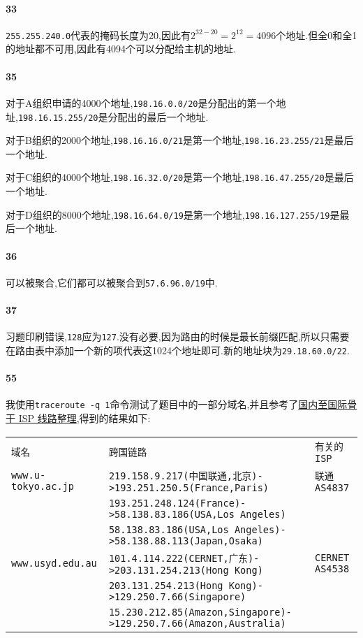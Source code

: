 \documentclass[a4paper]{article}
\begin{document}
\paragraph{33}
\verb|255.255.240.0|代表的掩码长度为20,因此有$2^{32-20}=2^{12}=4096$个地址.但全0和全1的地址都不可用,因此有4094个可以分配给主机的地址.
\paragraph{35}
对于A组织申请的4000个地址,\verb|198.16.0.0/20|是分配出的第一个地址,\verb|198.16.15.255/20|是分配出的最后一个地址.

对于B组织的2000个地址,\verb|198.16.16.0/21|是第一个地址,\verb|198.16.23.255/21|是最后一个地址.

对于C组织的4000个地址,\verb|198.16.32.0/20|是第一个地址,\verb|198.16.47.255/20|是最后一个地址.

对于D组织的8000个地址,\verb|198.16.64.0/19|是第一个地址,\verb|198.16.127.255/19|是最后一个地址.
\paragraph{36}
可以被聚合,它们都可以被聚合到\verb|57.6.96.0/19|中.
\paragraph{37}
习题印刷错误,\verb|128|应为\verb|127|.没有必要,因为路由的时候是最长前缀匹配,所以只需要在路由表中添加一个新的项代表这1024个地址即可.新的地址块为\verb|29.18.60.0/22|.
\paragraph{55}
我使用\verb|traceroute -q 1|命令测试了题目中的一部分域名,并且参考了\href{https://www.gd1214b.icu/post/qfDddx_kZ/}{国内至国际骨干 ISP 线路整理},得到的结果如下:
\begin{table}[H]
    \begin{tabular}{|lll|}
        \hline
        \verb|域名|                & \verb|跨国链路|                                                            & \verb|有关的ISP|        \\
        \verb|www.u-tokyo.ac.jp| & \verb|219.158.9.217(中国联通,北京)->193.251.250.5(France,Paris)|             & \verb|联通AS4837|      \\
                                 & \verb|193.251.248.124(France)->58.138.83.186(USA,Los Angeles)|         &                      \\
                                 & \verb|58.138.83.186(USA,Los Angeles)->58.138.88.113(Japan,Osaka)|      &                      \\
        \verb|www.usyd.edu.au|   & \verb|101.4.114.222(CERNET,广东)->203.131.254.213(Hong Kong)|            & \verb|CERNET AS4538| \\
                                 & \verb|203.131.254.213(Hong Kong)->129.250.7.66(Singapore)|             &                      \\
                                 & \verb|15.230.212.85(Amazon,Singapore)->129.250.7.66(Amazon,Australia)| &                      \\
        \hline
    \end{tabular}
\end{table}
\end{document}
